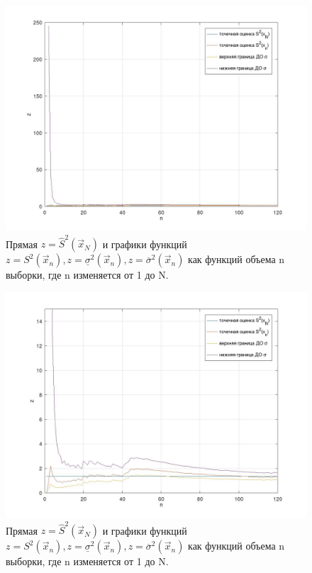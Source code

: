 \begin{figure}[H]
	\centering
	\includegraphics[scale=0.4]{assets/g2-1.jpg}
	\caption{Прямая $z=\hat S^2 (\vec x_N)$ и графики функций $z= S^2 (\vec x_n), z= \underline \sigma^2 (\vec x_n), z =\overline \sigma^2 (\vec x_n)$ как функций объема n выборки, где n изменяется от 1 до N.}
\end{figure}

\begin{figure}[H]
	\centering
	\includegraphics[scale=0.4]{assets/g2-2.jpg}
	\caption{Прямая $z=\hat S^2 (\vec x_N)$ и графики функций $z= S^2 (\vec x_n), z= \underline \sigma^2 (\vec x_n), z =\overline \sigma^2 (\vec x_n)$ как функций объема n выборки, где n изменяется от 1 до N.}
\end{figure}
